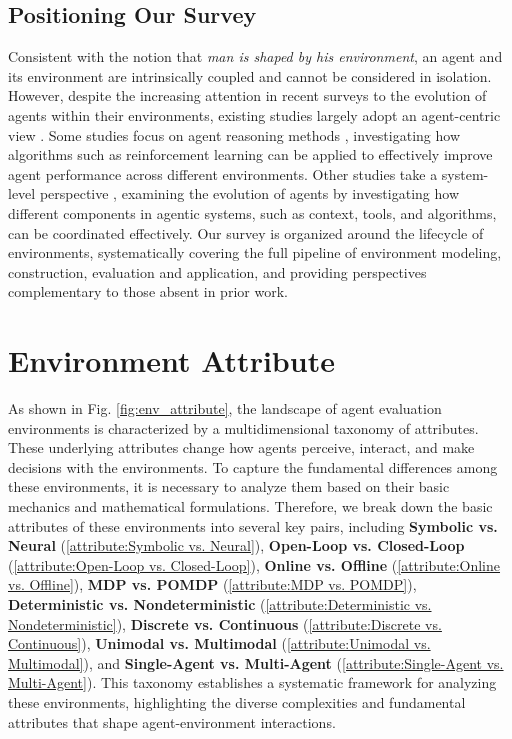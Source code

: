 \documentclass{llmxive}
\begin{document}
\subsection{Positioning Our Survey}
Consistent with the notion that \textit{man is shaped by his environment}, an agent and its environment are intrinsically coupled and cannot be considered in isolation. However, despite the increasing attention in recent surveys to the evolution of agents within their environments, existing studies largely adopt an agent-centric view \cite{survey_agent_adaptation,survey_agent_reason, survey_agent_search, survey_agent_system, survey_agent_rl, survey_agent_efficient, survey_agent_evo}. Some studies focus on agent reasoning methods \cite{survey_agent_rl, survey_agent_search, survey_agent_reason}, investigating how algorithms such as reinforcement learning can be applied to effectively improve agent performance across different environments.
Other studies take a system-level perspective \cite{survey_agent_adaptation,survey_agent_evo,survey_agent_system}, examining the evolution of agents by investigating how different components in agentic systems, such as context, tools, and algorithms, can be coordinated effectively. Our survey is organized around the lifecycle of environments, systematically covering the full pipeline of environment modeling, construction, evaluation and application, and providing perspectives complementary to those absent in prior work.


\section{Environment Attribute} \label{sec:env_attr}

As shown in Fig. \ref{fig:env_attribute}, the landscape of agent evaluation environments is characterized by a multidimensional taxonomy of attributes. These underlying attributes change how agents perceive, interact, and make decisions with the environments. To capture the fundamental differences among these environments, it is necessary to analyze them based on their basic mechanics and mathematical formulations. Therefore, we break down the basic attributes of these environments into several key pairs, including \textbf{Symbolic vs. Neural} (\cref{attribute:Symbolic vs. Neural}), \textbf{Open-Loop vs. Closed-Loop} (\cref{attribute:Open-Loop vs. Closed-Loop}), \textbf{Online vs. Offline} (\cref{attribute:Online vs. Offline}), \textbf{MDP vs. POMDP} (\cref{attribute:MDP vs. POMDP}), \textbf{Deterministic vs. Nondeterministic} (\cref{attribute:Deterministic vs. Nondeterministic}), \textbf{Discrete vs. Continuous} (\cref{attribute:Discrete vs. Continuous}), \textbf{Unimodal vs. Multimodal} (\cref{attribute:Unimodal vs. Multimodal}), and \textbf{Single-Agent vs. Multi-Agent} (\cref{attribute:Single-Agent vs. Multi-Agent}). This taxonomy establishes a systematic framework for analyzing these environments, highlighting the diverse complexities and fundamental attributes that shape agent-environment interactions.
\end{document}
